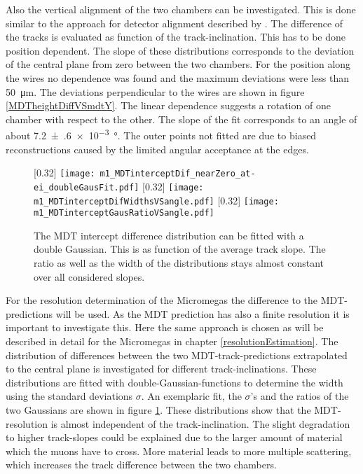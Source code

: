 \documentclass[
twoside,            %
BCOR1.4cm,          %
10pt,               %
headings=normal,    %
headsepline,        %
clearplainpage,		%
final,              %
div=14,
open=right,
bibliography=toc
]{scrreprt}
\begin{document}
Also the vertical alignment of the two chambers can be investigated.
This is done similar to the approach for detector alignment described by \cite{loeselMaster}.
The difference of the tracks is evaluated as function of the track-inclination.
This has to be done position dependent.
The slope of these distributions corresponds to the deviation of the central plane from zero between the two chambers.
For the position along the wires no dependence was found and the maximum deviations were less than \SI{50}{\micro\m}.
The deviations perpendicular to the wires are shown in figure \ref{MDTheightDiffVSmdtY}.
The linear dependence suggests a rotation of one chamber with respect to the other.
The slope of the fit corresponds to an angle of about \SI{7.2(6)e-3}{\degree}.
The outer points not fitted are due to biased reconstructions caused by the limited angular acceptance at the edges.

\begin{figure}[!h]
	\centering
	[0.32\textwidth]
	{\texttt{[image: m1\_MDTinterceptDif\_nearZero\_at-ei\_doubleGausFit.pdf]}}
	\hfill
	[0.32\textwidth]
	{\texttt{[image: m1\_MDTinterceptDifWidthsVSangle.pdf]}}
	\hfill
	[0.32\textwidth]
	{\texttt{[image: m1\_MDTinterceptGausRatioVSangle.pdf]}}
	\vspace{-2mm}
	\caption{
		The MDT intercept difference distribution can be fitted with a double Gaussian.
		This is as function of the average track slope.
		The ratio as well as the width of the distributions stays almost constant over all considered slopes.
	}
	\label{MDTresolution}
\end{figure}

For the resolution determination of the Micromegas the difference to the MDT-predictions will be used.
As the MDT prediction has also a finite resolution it is important to investigate this.
Here the same approach is chosen as will be described in detail for the Micromegas in chapter \ref{resolutionEstimation}.
The distribution of differences between the two MDT-track-predictions extrapolated to the central plane is investigated for different track-inclinations.
These distributions are fitted with double-Gaussian-functions to determine the width using the standard deviations $\sigma$.
An exemplaric fit, the $\sigma$'s and the ratios of the two Gaussians are shown in figure \ref{MDTresolution}.
These distributions show that the MDT-resolution is almost independent of the track-inclination.
The slight degradation to higher track-slopes could be explained due to the larger amount of material which the muons have to cross.
More material leads to more multiple scattering, which increases the track difference between the two chambers.
\end{document}
